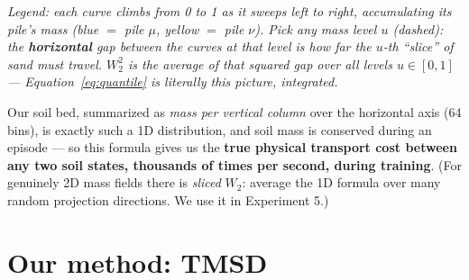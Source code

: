 \documentclass[11pt,a4paper]{article}
\begin{document}
\begin{center}

{\scriptsize\emph{Legend: each curve climbs from 0 to 1 as it sweeps left to
right, accumulating its pile's mass (blue $=$ pile $\mu$, yellow $=$ pile
$\nu$). Pick any mass level $u$ (dashed): the \textbf{horizontal} gap between
the curves at that level is how far the $u$-th ``slice'' of sand must travel.
$W_2^2$ is the average of that squared gap over all levels $u \in [0,1]$ ---
Equation~\eqref{eq:quantile} is literally this picture, integrated.}}
\end{center}

Our soil bed, summarized as \emph{mass per vertical column} over the horizontal
axis (64 bins), is exactly such a 1D distribution, and soil mass is conserved
during an episode --- so this formula gives us the \textbf{true physical
transport cost between any two soil states, thousands of times per second,
during training}. (For genuinely 2D mass fields there is \emph{sliced} $W_2$:
average the 1D formula over many random projection directions. We use it in
Experiment 5.)

\section{Our method: TMSD}
\end{document}

